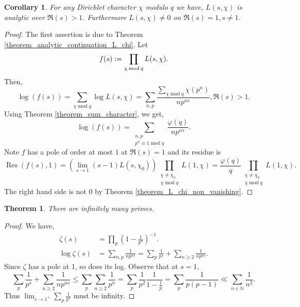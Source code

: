 \documentclass{article}
\newtheorem{theorem}{Theorem} [section]
\newtheorem{corollary}{Corollary} [section]
\DeclareMathOperator{\tmod}{mod}
\DeclareMathOperator{\Res}{Res}
\newcommand{\defeq}{\vcentcolon=}
\newcommand{\N}[0]{\mathbb{N}}
\begin{document}
\begin{corollary}
  For any Dirichlet character $\chi$ modulo $q$ we have, $L(s,\chi)$ is analytic over $\Re(s)>1$. Furthermore $L(s,\chi)\not=0$ on $\Re(s)=1,s\not=1$.
\end{corollary}

\begin{proof}The first assertion is due to Theorem \ref{theorem_analytic_continuation_L_chi}. 
  Let
  \begin{equation*}
    f(s) \defeq \prod_{\chi\tmod q}L(s,\chi).
  \end{equation*}
  Then,
  \begin{equation*}
    \log(f(s)) = \sum_{\chi\tmod q}\log L(s,\chi) = \sum_{n,p}{\frac {\sum_{\chi\tmod q} \chi(p^n)} {np^{ns}}},\Re(s)>1.
  \end{equation*}
  Using Theorem \ref{theorem_sum_character}, we get,
  \begin{equation*}
    \log(f(s)) = \sum_{\substack{n,p\\ p^n\equiv 1\tmod q}} {\frac {\varphi(q)} {np^{ns}}}.
  \end{equation*}
  Note $f$ has a pole of order at most $1$ at $\Re(s)=1$ and its residue is 
  \begin{equation*}
    \Res(f(s),1) = \left(\lim_{s\to1}(s-1)L(s,\chi_0)\right)\prod_{\substack{\chi\not=\chi_0\\ \chi\tmod q}}L(1,\chi) = {\frac {\varphi(q)} q}\prod_{\substack{\chi\not=\chi_0\\ \chi\tmod q}}L(1,\chi).
  \end{equation*}
  The right hand side is not $0$ by Theorem \ref{theorem_L_chi_non_vanishing}.
\end{proof}

\begin{theorem}
  There are infinitely many primes.
  \label{theorem_prime_infinite_ver_2}
\end{theorem}

\begin{proof}
  We have,
  \begin{align*}
    \zeta(s) & = \prod_{p}\left(1-{\frac 1 {p^s}}\right)^{-1}.\\
    \log\zeta(s) & = \sum_{n,p}{\frac 1 {np^{ns}}} = \sum_{p}{\frac 1 {p^s}}+\sum_{n\geq 2}{\frac 1 {np^{ns}}}.
  \end{align*}
  Since $\zeta$ has a pole at $1$, so does its log. Observe that at $s=1$,
  \begin{equation*}
    \sum_{p}{\frac 1 {p^s}}+\sum_{n\geq 2}{\frac 1 {np^{ns}}} \leq \sum_{p}\sum_{n\geq 2}{\frac 1 {p^n}} = \sum_{p}{\frac 1 {p^2}}{\frac 1 {1-{\frac 1 p}}} = \sum_{p} {\frac 1 {p(p-1)}} \ll  \sum_{n\in\N}{\frac 1 {n^2}}.
  \end{equation*} 
  Thus $\lim_{s\to1^+}\sum_{p}{\frac 1 {p^s}}$ must be infinity.
\end{proof}
\end{document}
